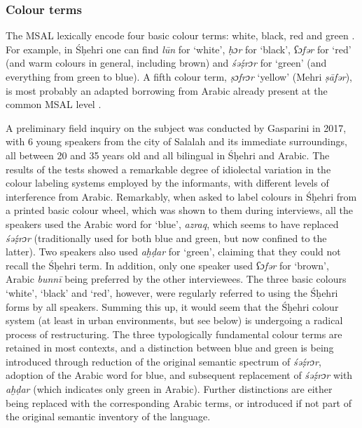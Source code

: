 \documentclass[output=paper]{langsci/langscibook}
\begin{document}
 \subsubsection{Colour terms}

The MSAL lexically encode four basic colour terms: white, black, red and green \citep[261--262]{Bulakh2004}. For example, in Śḥehri one can find \textit{lūn} for ‘white’, \textit{ḥɔr} for ‘black’, \textit{ʕɔfər} for ‘red’ (and warm colours in general, including brown) and \textit{śəẓ́rɔr} for ‘green’ (and everything from green to blue). A fifth colour term, \textit{ṣɔfrɔr} ‘yellow’ (Mehri \textit{ṣāfər}), is most probably an adapted borrowing from Arabic already present at the common MSAL level \citep[271]{Bulakh2004}. 

A preliminary field inquiry on the subject was conducted by Gasparini in 2017, with 6 young speakers from the city of Salalah and its immediate surroundings, all between 20 and 35 years old and all bilingual in Śḥehri and Arabic. The results of the tests showed a remarkable degree of idiolectal variation in the colour labeling systems employed by the informants, with different levels of interference from Arabic. Remarkably, when asked to label colours in Śḥehri from a printed basic colour wheel, which was shown to them during interviews, all the speakers used the Arabic word for ‘blue’, \textit{azraq}, which seems to have replaced \textit{śəẓ́rɔr} (traditionally used for both blue and green, but now confined to the latter). Two speakers also used \textit{aḫḍar} for ‘green’, claiming that they could not recall the Śḥehri term. In addition, only one speaker used \textit{ʕɔfər} for ‘brown’, Arabic \textit{bunnī} being preferred by the other interviewees. The three basic colours ‘white’, ‘black’ and ‘red’, however, were regularly referred to using the Śḥehri forms by all speakers. Summing this up, it would seem that the Śḥehri colour system (at least in urban environments, but see below) is undergoing a radical process of restructuring. The three typologically fundamental colour terms are retained in most contexts, and a distinction between blue and green is being introduced through reduction of the original semantic spectrum of \textit{śəẓ́rɔr}, adoption of the Arabic word for blue, and subsequent replacement of \textit{śəẓ́rɔr} with \textit{aḫḍar} (which indicates only green in Arabic). Further distinctions are either being replaced with the corresponding Arabic terms, or introduced if not part of the original semantic inventory of the language.
\end{document}
